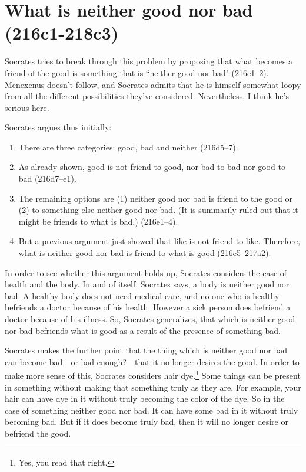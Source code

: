 \documentclass[11pt]{article}
\begin{document}

\section{What is neither good nor bad (216c1-218c3)}

Socrates tries to break through this problem by proposing that what becomes
a friend of the good is something that is ``neither good nor bad"
(216c1--2).  Menexenus doesn't follow, and Socrates admits that he is
himself somewhat loopy from all the different possibilities they've
considered.  Nevertheless, I think he's serious here.

Socrates argues thus initially:

\begin{enumerate}

    \item There are three categories: good, bad and neither (216d5--7).

    \item As already shown, good is not friend to good, nor bad to bad nor
        good to bad (216d7--e1).

    \item The remaining options are (1) neither good nor bad is friend to
        the good or (2) to something else neither good nor bad.  (It is
        summarily ruled out that it might be friends to what is bad.)
        (216e1--4).

    \item But a previous argument just showed that like is not friend to
        like.  Therefore, what is neither good nor bad is friend to what is
        good (216e5--217a2).

\end{enumerate}

In order to see whether this argument holds up, Socrates considers the case
of health and the body.  In and of itself, Socrates says, a body is neither
good nor bad.  A healthy body does not need medical care, and no one who is
healthy befriends a doctor because of his health.  However a sick person
does befriend a doctor because of his illness.  So, Socrates generalizes,
that which is neither good nor bad befriends what is good as a result of
the presence of something bad.

Socrates makes the further point that the thing which is neither good nor
bad can become bad---or bad enough?---that it no longer desires the good.
In order to make more sense of this, Socrates considers hair
dye.\footnote{Yes, you read that right.}  Some things can be present in
something without making that something truly as they are.  For example,
your hair can have dye in it without truly becoming the color of the dye.
So in the case of something neither good nor bad.  It can have some bad in
it without truly becoming bad.  But if it does become truly bad, then it
will no longer desire or befriend the good.
\end{document}
